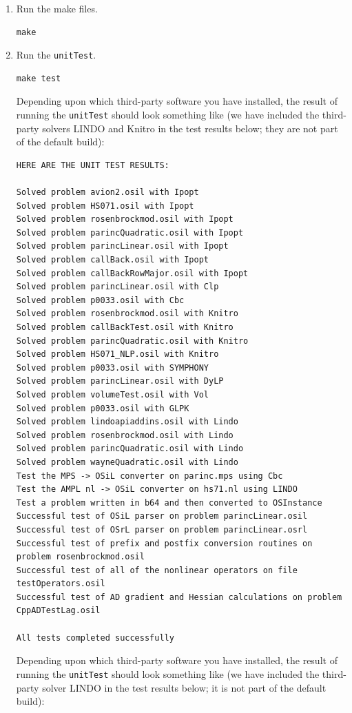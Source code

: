 \documentclass[11pt]{article}
\renewcommand{\_}{{\char"5F}}
\renewcommand{\{}{{\char"7B}}
\renewcommand{\}}{{\char"7D}}
\renewcommand{\^}{{\char"0D}}
\renewcommand{\'}{{\char"0D}}
\newif\ifknitro \knitrofalse    %
\begin{document}
\begin{enumerate}[{\bf Step 1:}]
\item{}  Run the make files.

\begin{verbatim}
make
\end{verbatim}

\item{} Run the {\tt unitTest}.

\begin{verbatim}
make test
\end{verbatim}

\ifknitro
Depending upon which third-party software you have installed, the result of running the {\tt unitTest} should look
something like (we have included the third-party solvers LINDO and Knitro in the test 
results below; they are not part of the default build):


{\small
\begin{verbatim}
HERE ARE THE UNIT TEST RESULTS:

Solved problem avion2.osil with Ipopt
Solved problem HS071.osil with Ipopt
Solved problem rosenbrockmod.osil with Ipopt
Solved problem parincQuadratic.osil with Ipopt
Solved problem parincLinear.osil with Ipopt
Solved problem callBack.osil with Ipopt
Solved problem callBackRowMajor.osil with Ipopt
Solved problem parincLinear.osil with Clp
Solved problem p0033.osil with Cbc
Solved problem rosenbrockmod.osil with Knitro
Solved problem callBackTest.osil with Knitro
Solved problem parincQuadratic.osil with Knitro
Solved problem HS071_NLP.osil with Knitro
Solved problem p0033.osil with SYMPHONY
Solved problem parincLinear.osil with DyLP
Solved problem volumeTest.osil with Vol
Solved problem p0033.osil with GLPK
Solved problem lindoapiaddins.osil with Lindo
Solved problem rosenbrockmod.osil with Lindo
Solved problem parincQuadratic.osil with Lindo
Solved problem wayneQuadratic.osil with Lindo
Test the MPS -> OSiL converter on parinc.mps using Cbc
Test the AMPL nl -> OSiL converter on hs71.nl using LINDO
Test a problem written in b64 and then converted to OSInstance
Successful test of OSiL parser on problem parincLinear.osil
Successful test of OSrL parser on problem parincLinear.osrl
Successful test of prefix and postfix conversion routines on problem rosenbrockmod.osil
Successful test of all of the nonlinear operators on file testOperators.osil
Successful test of AD gradient and Hessian calculations on problem CppADTestLag.osil

All tests completed successfully
\end{verbatim}
}
\else
Depending upon which third-party software you have installed, the result of running the {\tt unitTest}
should look
something like (we have included the third-party solver LINDO in the test results below; it is not
part of the default build):



\end{enumerate}
\end{document}
